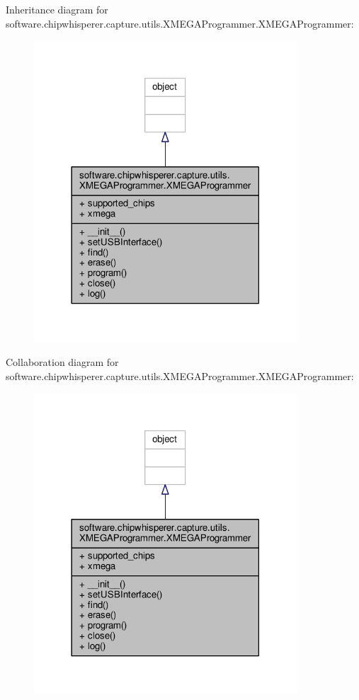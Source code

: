 Inheritance diagram for software.\+chipwhisperer.\+capture.\+utils.\+X\+M\+E\+G\+A\+Programmer.\+X\+M\+E\+G\+A\+Programmer\+:\nopagebreak
\begin{figure}[H]
\begin{center}
\leavevmode
\includegraphics[width=278pt]{d2/dea/classsoftware_1_1chipwhisperer_1_1capture_1_1utils_1_1XMEGAProgrammer_1_1XMEGAProgrammer__inherit__graph}
\end{center}
\end{figure}


Collaboration diagram for software.\+chipwhisperer.\+capture.\+utils.\+X\+M\+E\+G\+A\+Programmer.\+X\+M\+E\+G\+A\+Programmer\+:\nopagebreak
\begin{figure}[H]
\begin{center}
\leavevmode
\includegraphics[width=278pt]{da/d0d/classsoftware_1_1chipwhisperer_1_1capture_1_1utils_1_1XMEGAProgrammer_1_1XMEGAProgrammer__coll__graph}
\end{center}
\end{figure}


